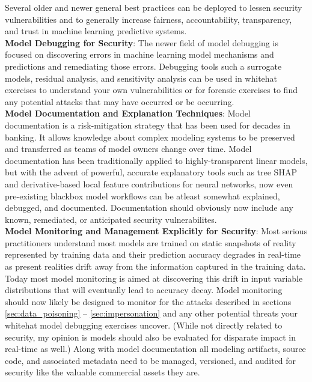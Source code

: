 \documentclass[fleqn]{article}
\begin{document}
Several older and newer general best practices can be deployed to lessen security vulnerabilities and to generally increase fairness, accountability, transparency, and trust in machine learning predictive systems.\\ 

\noindent\textbf{Model Debugging for Security}: The newer field of model debugging is focused on discovering errors in machine learning model mechanisms and predictions and remediating those errors. Debugging tools such a surrogate models, residual analysis, and sensitivity analysis can be used in whitehat exercises to understand your own vulnerabilities or for forensic exercises to find any potential attacks that may have occurred or be occurring.\\

\noindent\textbf{Model Documentation and Explanation Techniques}: Model documentation is a risk-mitigation strategy that has been used for decades in banking. It allows knowledge about complex modeling systems to be preserved and transferred as teams of model owners change over time. Model documentation has been traditionally applied to highly-transparent linear models, but with the advent of powerful, accurate explanatory tools such as tree SHAP and derivative-based local feature contributions for neural networks, now even pre-existing blackbox model workflows can be atleast somewhat explained, debugged, and documented. Documentation should obviously now include any known, remediated, or anticipated security vulnerabilites.\\

\noindent\textbf{Model Monitoring and Management Explicitly for Security}: Most serious practitioners understand most models are trained on static snapshots of reality represented by training data and their prediction accuracy degrades in real-time as present realities drift away from the information captured in the training data. Today most model monitoring is aimed at discovering this drift in input variable distributions that will eventually lead to accuracy decay. Model monitoring should now likely be designed to monitor for the attacks described in sections  \ref{sec:data_poisoning} -- \ref{sec:impersonation} and any other potential threats your whitehat model debugging exercises uncover. (While not directly related to security, my opinion is models should also be evaluated for disparate impact in real-time as well.) Along with model documentation all modeling artifacts, source code, and associated metadata need to be managed, versioned, and audited for security like the valuable commercial assets they are.\\
\end{document}
